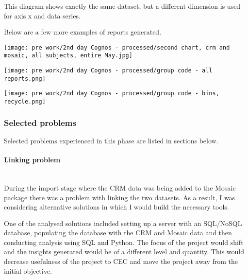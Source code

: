 This diagram shows exactly the same dataset, but a different dimension is used for axis x and data series.

Below are a few more examples of reports generated.


\begin{center}
  \texttt{[image: pre work/2nd day Cognos - processed/second chart, crm and mosaic, all subjects, entire May.jpg]}
\end{center}


\begin{center}
  \texttt{[image: pre work/2nd day Cognos - processed/group code - all reports.png]}
\end{center}



\begin{center}
  \texttt{[image: pre work/2nd day Cognos - processed/group code - bins, recycle.png]}
\end{center}



			\subsubsection{Selected problems}
			
Selected problems experienced in this phase are listed in sections below.			
			
				\paragraph{Linking problem}\mbox{}\\
During the import stage where the CRM data was being added to the Mosaic package there was a problem with linking the two datasets. As a result, I was considering alternative solutions in which I would build the necessary tools.

One of the analysed solutions included setting up a server with an SQL/NoSQL database, populating the database with the CRM and Mosaic data and then conducting analysis using SQL and Python. The focus of the project would shift and the insights generated would be of a different level and quantity. This would decrease usefulness of the project to CEC and move the project away from the initial objective.

